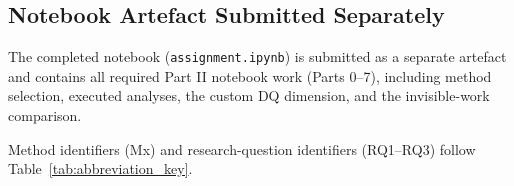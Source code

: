 \subsection{Notebook Artefact Submitted Separately}
\label{sec:deliverable5}

The completed notebook (\texttt{assignment.ipynb}) is submitted as a separate artefact and contains all required Part II notebook work (Parts 0--7), including method selection, executed analyses, the custom DQ dimension, and the invisible-work comparison.

Method identifiers (Mx) and research-question identifiers (RQ1--RQ3) follow Table~\ref{tab:abbreviation_key}.
